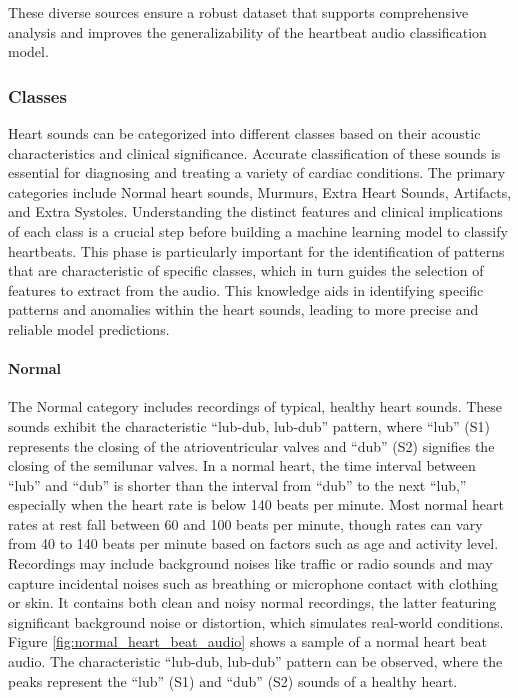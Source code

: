 \noindent
These diverse sources ensure a robust dataset that supports comprehensive analysis and improves the generalizability of the heartbeat audio classification model.
\subsubsection*{Classes} %

Heart sounds can be categorized into different classes based on their acoustic characteristics and clinical significance.
Accurate classification of these sounds is essential for diagnosing and treating a variety of cardiac conditions.
The primary categories include Normal heart sounds, Murmurs, Extra Heart Sounds, Artifacts, and Extra Systoles.
Understanding the distinct features and clinical implications of each class is a crucial step before building a
machine learning model to classify heartbeats.
This phase is particularly important for the identification of patterns that are characteristic of specific classes,
which in turn guides the selection of features to extract from the audio.
This knowledge aids in identifying specific patterns and anomalies within the heart sounds,
leading to more precise and reliable model predictions.

\paragraph{Normal}
The Normal category includes recordings of typical, healthy heart sounds. These sounds exhibit the characteristic ``lub-dub, lub-dub'' pattern,
where ``lub'' (S1) represents the closing of the atrioventricular valves and ``dub'' (S2) signifies the closing of the semilunar valves.
In a normal heart, the time interval between ``lub'' and ``dub'' is shorter than the interval from ``dub'' to the next ``lub,''
especially when the heart rate is below 140 beats per minute. Most normal heart rates at rest fall between 60 and 100 beats per minute,
though rates can vary from 40 to 140 beats per minute based on factors such as age and activity level.
Recordings may include background noises like traffic or radio sounds and may capture incidental noises such as breathing or microphone
contact with clothing or skin. It contains both clean and noisy normal recordings,
the latter featuring significant background noise or distortion, which simulates real-world conditions.\\
Figure \ref{fig:normal_heart_beat_audio} shows a sample of a normal heart beat audio.
The characteristic ``lub-dub, lub-dub'' pattern can be observed, where the peaks represent the ``lub'' (S1) and ``dub'' (S2) sounds of a healthy heart.

